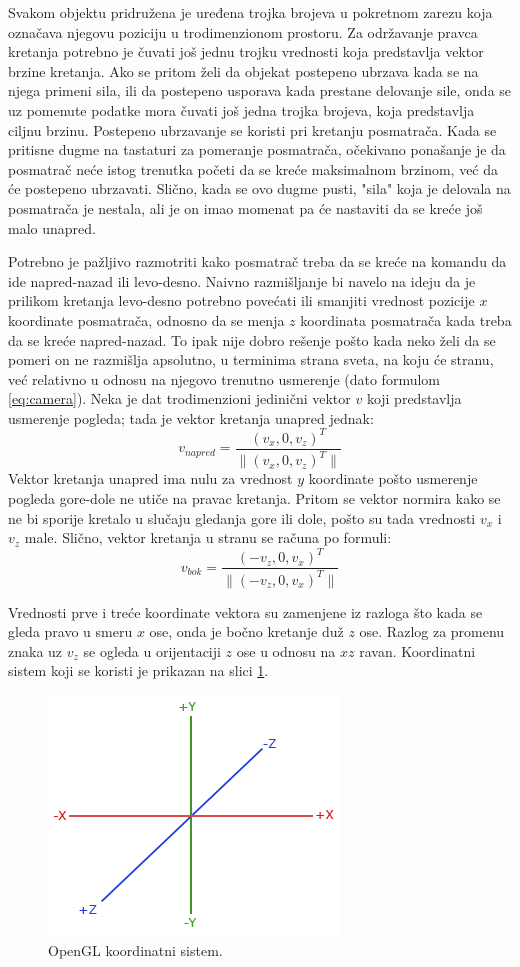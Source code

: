 \documentclass[12pt,oneside]{memoir}
\begin{document}
Svakom objektu pridružena je  uređena trojka brojeva u pokretnom zarezu koja označava njegovu poziciju u trodimenzionom prostoru.
Za održavanje pravca kretanja potrebno je čuvati još jednu trojku vrednosti koja predstavlja vektor brzine kretanja.
Ako se pritom želi da objekat postepeno ubrzava kada se na njega primeni sila, ili da postepeno usporava 
kada prestane delovanje sile, onda se uz pomenute podatke mora čuvati još jedna trojka brojeva, koja predstavlja ciljnu brzinu.
Postepeno ubrzavanje se koristi pri kretanju posmatrača. 
Kada se pritisne dugme na tastaturi za pomeranje posmatrača, očekivano ponašanje je da posmatrač neće istog trenutka 
početi da se kreće maksimalnom brzinom, već da će postepeno ubrzavati.
Slično, kada se ovo dugme pusti, "sila" koja je delovala na posmatrača je nestala, ali je on imao momenat pa će
nastaviti da se kreće još malo unapred.

Potrebno je pažljivo razmotriti kako posmatrač treba da se kreće na komandu da ide napred-nazad ili levo-desno.
Naivno razmišljanje bi navelo na ideju da je prilikom kretanja levo-desno potrebno povećati ili smanjiti vrednost pozicije $x$ koordinate posmatrača,
odnosno da se menja $z$ koordinata posmatrača kada treba da se kreće napred-nazad.
To ipak nije dobro rešenje pošto kada neko želi da se pomeri on ne razmišlja apsolutno, u terminima strana sveta, na koju će stranu, 
već relativno u odnosu na njegovo trenutno usmerenje (dato formulom \ref{eq:camera}).
Neka je dat trodimenzioni jedinični vektor $v$ koji predstavlja usmerenje pogleda; tada je vektor 
kretanja unapred jednak: 
$$ v_{napred} = \frac{(v_x, 0, v_z)^T}{\|(v_x, 0, v_z)^T\|} $$
Vektor kretanja unapred ima nulu za vrednost $y$ koordinate pošto usmerenje pogleda gore-dole ne utiče na pravac kretanja.
Pritom se vektor normira kako se ne bi sporije kretalo u slučaju gledanja gore ili dole, 
pošto su tada vrednosti $v_x$ i $v_z$ male.
Slično, vektor kretanja u stranu se računa po formuli:
$$ v_{bok} = \frac{(-v_z, 0, v_x)^T}{\|(-v_z, 0, v_x)^T\|} $$

Vrednosti prve i treće koordinate vektora su zamenjene iz razloga što kada se gleda pravo u smeru $x$ ose, 
onda je bočno kretanje duž $z$ ose. Razlog za promenu znaka uz $v_z$ se ogleda u orijentaciji $z$ ose u odnosu na $xz$ ravan.
Koordinatni sistem koji se koristi je prikazan na slici \ref{fig:coord}.

\begin{figure}[h!]
	\centerfloat
	\includegraphics[scale=0.75]{coord.png}
	\caption{OpenGL koordinatni sistem.}
	\label{fig:coord}
\end{figure}
\end{document}
